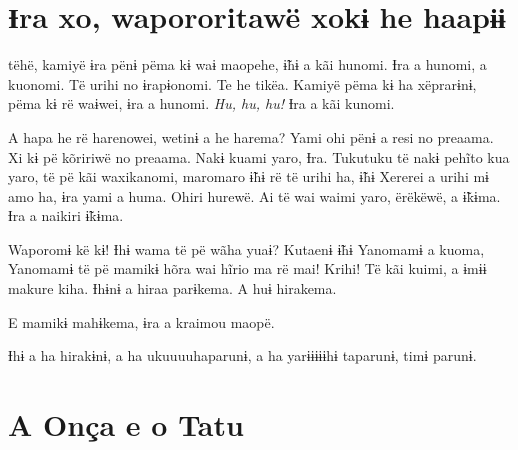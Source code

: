 

\chapter[Ɨra xo, wapororitawë xo kɨ he haapɨɨ]{Ɨra xo, wapororitawë xo\break kɨ he haapɨɨ}

 tëhë, kamiyë ɨra pënɨ pëma kɨ waɨ maopehe, ɨ̃hɨ a kãi hunomi. Ɨra a
hunomi, a kuonomi. Të urihi no ɨrapɨonomi. Te he tikëa. Kamiyë pëma kɨ
ha xëprarɨnɨ, pëma kɨ rë waɨwei, ɨra a hunomi. \textit{Hu, hu, hu!} Ɨra a kãi
kunomi. 

A hapa he rë harenowei, wetinɨ a he harema? Yami ohi pënɨ a resi no
preaama. Xi kɨ pë kõririwë no preaama. Nakɨ kuami yaro, Ɨra. Tukutuku të
nakɨ pehĩto kua yaro, të pë kãi waxikanomi, maromaro ɨ̃hɨ rë të urihi ha,
ɨ̃hɨ Xererei a urihi mɨ amo ha, ɨra yami a huma. Ohiri hurewë. Ai të wai
waimi yaro, ërëkëwë, a ɨ̃kɨma. Ɨra a naikiri ɨ̃kɨma. 


Waporomɨ kë kɨ! Ɨhɨ wama të pë wãha yuaɨ? Kutaenɨ ɨ̃hɨ Yanomamɨ a kuoma,
Yanomamɨ të pë mamikɨ hõra wai hĩrio ma rë mai! Krihi! Të kãi kuimi, a
ɨmɨɨ makure kiha. Ɨhɨnɨ a hiraa parɨkema. A huɨ hirakema. 

E mamikɨ mahɨkema, ɨra a kraimou maopë. 

Ɨhɨ a ha hirakɨnɨ, a ha ukuuuuhaparunɨ, a ha yarɨɨɨɨɨhɨ taparunɨ, timɨ
parunɨ. 

\chapter{A Onça e o Tatu}
 
  

